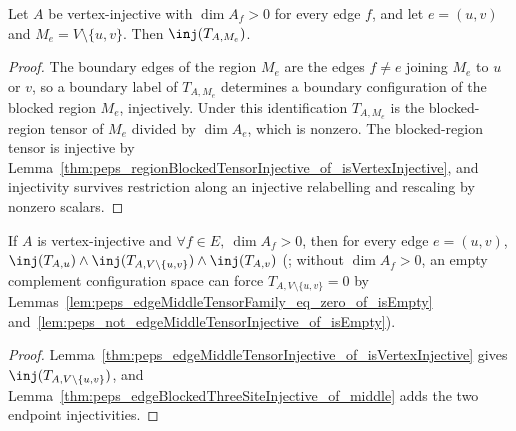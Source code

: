 \begin{lemma}%
    \label{thm:peps_edgeMiddleTensorInjective_of_isVertexInjective}
    \leanok
    Let $A$ be vertex-injective with $\dim A_f>0$ for every edge $f$, and let
    $e=(u,v)$ and $M_e=V\setminus\{u,v\}$. Then $\inj(T_{A,M_e})$.
\end{lemma}
\begin{proof}\leanok
    The boundary edges of the region $M_e$ are the edges $f\neq e$ joining $M_e$
    to $u$ or $v$, so a boundary label of $T_{A,M_e}$ determines a boundary
    configuration of the blocked region $M_e$, injectively. Under this
    identification $T_{A,M_e}$ is the blocked-region tensor of $M_e$ divided by
    $\dim A_e$, which is nonzero. The blocked-region tensor is injective by
    Lemma~\ref{thm:peps_regionBlockedTensorInjective_of_isVertexInjective}, and
    injectivity survives restriction along an injective relabelling and
    rescaling by nonzero scalars.
\end{proof}

\begin{lemma}%
    \label{thm:peps_edgeBlockedThreeSiteInjective}
    \leanok
    If $A$ is vertex-injective and $\forall f\in E,\ \dim A_f>0$, then for every
    edge $e=(u,v)$,
    $\inj(T_{A,u})\wedge\inj(T_{A,V\setminus\{u,v\}})\wedge\inj(T_{A,v})$
    (\cite[Section~3]{Molnar2018NormalPEPS}; without $\dim A_f>0$, an empty
    complement configuration space can force $T_{A,V\setminus\{u,v\}}=0$ by
    Lemmas~\ref{lem:peps_edgeMiddleTensorFamily_eq_zero_of_isEmpty}
    and~\ref{lem:peps_not_edgeMiddleTensorInjective_of_isEmpty}).
\end{lemma}
\begin{proof}\leanok
    Lemma~\ref{thm:peps_edgeMiddleTensorInjective_of_isVertexInjective} gives
    $\inj(T_{A,V\setminus\{u,v\}})$, and
    Lemma~\ref{thm:peps_edgeBlockedThreeSiteInjective_of_middle} adds the two
    endpoint injectivities.
\end{proof}

